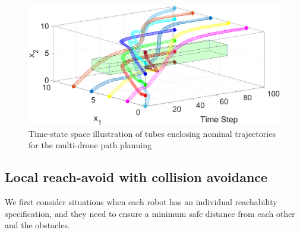 %
\begin{figure}[t]
    \large
     \centering
         \includegraphics[width=\columnwidth]{figures/10t_final.eps}
        \caption{Time-state space illustration of tubes enclosing nominal trajectories for the multi-drone path planning}
        \label{fig:3dtubes}
        \vspace{-.3cm}
\end{figure}

\subsection{Local reach-avoid with collision avoidance}
\label{sec:local reach-avoid}
%
We first consider situations when each robot has an individual reachability specification, 
and they need to ensure a minimum safe distance from each other and the obstacles.

